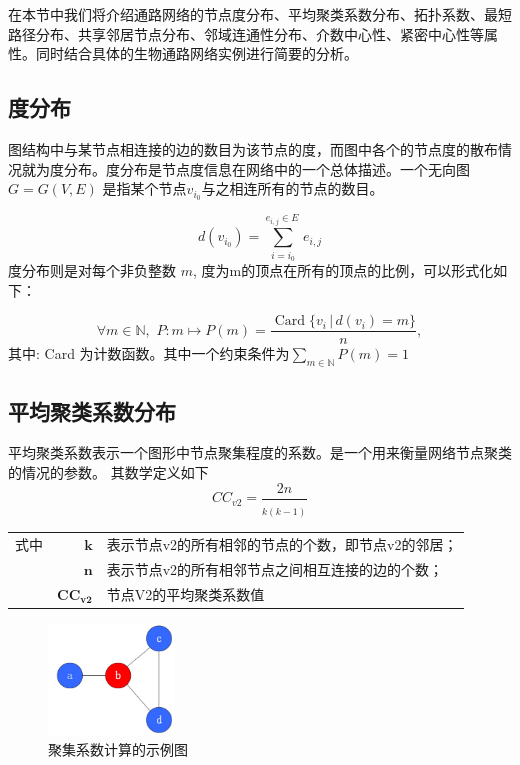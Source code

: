 在本节中我们将介绍通路网络的节点度分布、平均聚类系数分布、拓扑系数、最短路径分布、共享邻居节点分布、邻域连通性分布、介数中心性、紧密中心性等属性。同时结合具体的生物通路网络实例进行简要的分析。

\subsection{度分布}
图结构中与某节点相连接的边的数目为该节点的度，而图中各个的节点度的散布情况就为度分布。度分布是节点度信息在网络中的一个总体描述。一个无向图 ${\displaystyle G=G(V,E)}$ 是指某个节点$ {\displaystyle v_{i_{0}}}$与之相连所有的节点的数目。

\begin{equation}\label{eq22}
	d( v_{i_{0}}) =\sum\limits ^{e_{i,j} \in E\ }_{i=i_{0}} e_{i,j}
\end{equation}
度分布则是对每个非负整数 ${\displaystyle m}$, 度为m的顶点在所有的顶点的比例，可以形式化如下：

\begin{equation}\label{eq23}
{\displaystyle \forall m\in \mathbb {N} ,\,\,P:m\mapsto P(m)={\frac {\operatorname {Card} \{v_{i}\,|\,d(v_{i})=m\}}{n}},}
\end{equation}
其中: Card 为计数函数。其中一个约束条件为$ {\displaystyle \sum _{m\in \mathbb {N} }P(m)=1}$

\subsection{平均聚类系数分布}
平均聚类系数表示一个图形中节点聚集程度的系数。是一个用来衡量网络节点聚类的情况的参数。 其数学定义如下
\begin{equation}\label{eq24}
CC_{v2} =\frac{2n}{_{k( k-1)}}
\end{equation}
\begin{tabularx}{\textwidth}{@{}l@{\quad}r@{———}X@{}}
式中 & $\boldsymbol{k}$ &  表示节点v2的所有相邻的节点的个数，即节点v2的邻居；\\
	& $\boldsymbol{n}$ &   表示节点v2的所有相邻节点之间相互连接的边的个数；\\
	& $\boldsymbol{CC_{v2}}$ &	节点V2的平均聚类系数值 \\
\end{tabularx}\vspace{3.15bp}

\begin{figure}[h]
\centering
\includegraphics[width = 0.3\textwidth]{fig22}
\caption[fig24]{聚集系数计算的示例图}
\label{fig24}
\end{figure}

